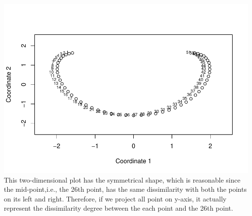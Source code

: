 \documentclass[
]{article}
\newenvironment{Shaded}{\begin{snugshade}}{\end{snugshade}}
\newcommand{\AttributeTok}[1]{\textcolor[rgb]{0.77,0.63,0.00}{#1}}
\newcommand{\DecValTok}[1]{\textcolor[rgb]{0.00,0.00,0.81}{#1}}
\newcommand{\FloatTok}[1]{\textcolor[rgb]{0.00,0.00,0.81}{#1}}
\newcommand{\FunctionTok}[1]{\textcolor[rgb]{0.00,0.00,0.00}{#1}}
\newcommand{\NormalTok}[1]{#1}
\newcommand{\OtherTok}[1]{\textcolor[rgb]{0.56,0.35,0.01}{#1}}
\newcommand{\SpecialCharTok}[1]{\textcolor[rgb]{0.00,0.00,0.00}{#1}}
\newcommand{\StringTok}[1]{\textcolor[rgb]{0.31,0.60,0.02}{#1}}
\begin{document}
\begin{Shaded}
\end{Shaded}

\includegraphics{HUDM6122-Homework_04-Chenguang-Pan_files/figure-latex/unnamed-chunk-7-1.pdf}
This two-dimensional plot has the symmetrical shape, which is reasonable
since the mid-point,i.e., the 26th point, has the same dissimilarity
with both the points on its left and right. Therefore, if we project all
point on y-axis, it actually represent the dissimilarity degree between
the each point and the 26th point.
\end{document}
